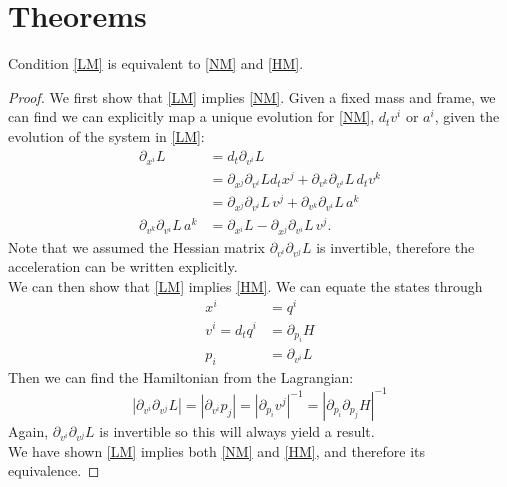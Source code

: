 \documentclass{techbrief}
\begin{document}
	\section{Theorems}
	\begin{thrm}
		Condition \ref{LM} is equivalent to \ref{NM} and \ref{HM}.
	\end{thrm}
	\begin{proof}
		We first show that \ref{LM} implies \ref{NM}. Given a fixed mass and frame, we can find we can explicitly map a unique evolution for \ref{NM}, $d_{t}v^{i}$ or $a^{i}$, given the evolution of the system in \ref{LM}:
		\begin{equation}
			\begin{aligned}
				\partial_{x^i}L&= d_t \partial_{v^i} L \\ &= \partial_{x^j} \partial_{v^i} L d_t x^j + \partial_{v^k} \partial_{v^i} L \, d_t v^k \\ &= \partial_{x^j} \partial_{v^i} L \, v^j + \partial_{v^k} \partial_{v^i} L \, a^k \\
				\partial_{v^k} \partial_{v^i} L \, a^k &= \partial_{x^i}L - \partial_{x^j} \partial_{v^i} L \, v^j .
			\end{aligned}
		\end{equation} 
		Note that we assumed the Hessian matrix $\partial_{v^{i}}\partial_{v^{j}}L$ is invertible, therefore the acceleration can be written explicitly. \\
		
		We can then show that \ref{LM} implies \ref{HM}. We can equate the states through
		\begin{equation}
			\begin{aligned}
				x^{i} &= q^{i} \\
				v^{i} = d_{t}q^{i} &= \partial_{p_{i}}H \\
				p_{i} &= \partial_{v^{i}}L
			\end{aligned}
		\end{equation}
		Then we can find the Hamiltonian from the Lagrangian:
		\begin{equation}
			\left| \partial_{v^i} \partial_{v^j} L \right| = \left| \partial_{v^i} p_j \right| = \left| \partial_{p_i} v^j \right|^{-1} = \left|\partial_{p_i}\partial_{p_j} H\right|^{-1}
		\end{equation}
		Again, $\partial_{v^{i}}\partial_{v^{j}}L$ is invertible so this will always yield a result. \\
		
		We have shown \ref{LM} implies both \ref{NM} and \ref{HM}, and therefore its equivalence.
	\end{proof}
\end{document}
